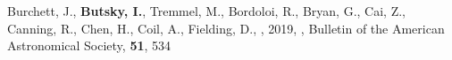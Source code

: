 \item[{\color{numcolor}\scriptsize\bfseries\textemdash}] Burchett, J., \textbf{Butsky, I.}, Tremmel, M., Bordoloi, R., Bryan, G., Cai, Z., Canning, R., Chen, H., Coil, A., Fielding, D., \etal, 2019, , Bulletin of the American Astronomical Society, \textbf{51}, 534
